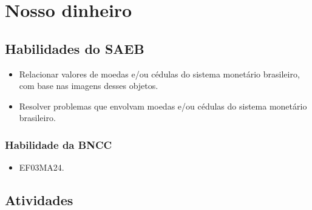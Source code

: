 \chapter{Nosso dinheiro}

\section*{Habilidades do SAEB}

\begin{itemize}
\item Relacionar valores de moedas e/ou cédulas do sistema monetário
brasileiro, com base nas imagens desses objetos.

\item Resolver problemas que envolvam moedas e/ou cédulas do sistema
monetário brasileiro.
\end{itemize}

\subsection{Habilidade da BNCC}

\begin{itemize}
  \item 
 EF03MA24.
\end{itemize}


\pagebreak

\section*{Atividades}

